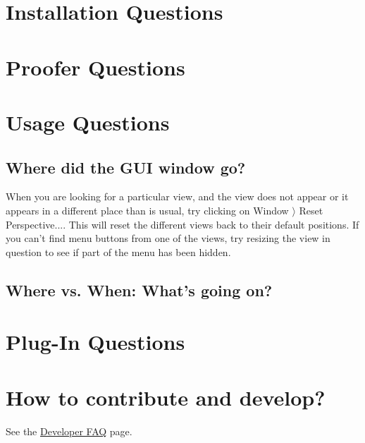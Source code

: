 \section{Installation Questions}

\section{Proofer Questions}

\section{Usage Questions}

\subsection{Where did the GUI window go?}

When you are looking for a particular view, and the view does not appear or it appears in a different place than is usual, try clicking on \textsf{Window $\rangle $ Reset Perspective...}. This will reset the different views back to their default positions. If you can't find menu buttons from one of the views, try resizing the view in question to see if part of the menu has been hidden.

\subsection{Where vs. When: What's going on?}

\section{Plug-In Questions}

\section{How to contribute and develop?}

See the \href{http://wiki.event-b.org/index.php/Developer_FAQ}{Developer FAQ} page.
